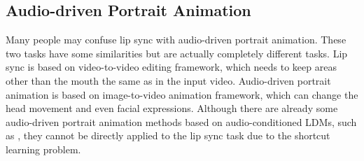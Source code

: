 \subsection{Audio-driven Portrait Animation}
Many people may confuse lip sync with audio-driven portrait animation. These two tasks have some similarities but are actually completely different tasks. Lip sync is based on video-to-video editing framework, which needs to keep areas other than the mouth the same as in the input video. Audio-driven portrait animation is based on image-to-video animation framework, which can change the head movement and even facial expressions. Although there are already some audio-driven portrait animation methods based on audio-conditioned LDMs, such as \cite{tian2024emo,chen2024echomimic,xu2024hallo,jiang2024loopy}, they cannot be directly applied to the lip sync task due to the shortcut learning problem.